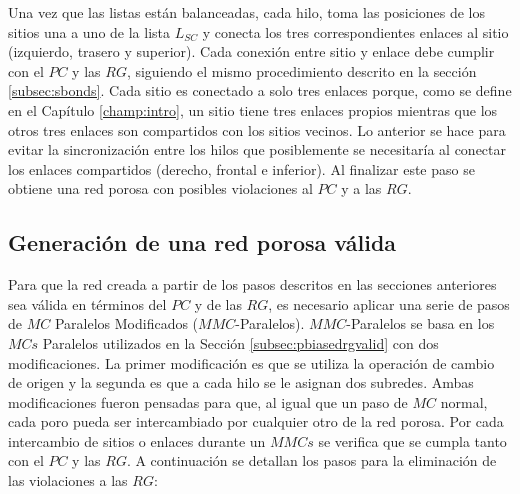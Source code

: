 Una vez que las listas están balanceadas, cada hilo, toma las posiciones de los sitios una a uno de la lista $L_{SC}$ y conecta los 
tres correspondientes enlaces al sitio (izquierdo, trasero y superior). Cada conexión entre sitio y enlace debe cumplir con 
el $PC$ y las $RG$, siguiendo el mismo procedimiento descrito en la sección \ref{subsec:sbonds}. Cada sitio es conectado a 
solo tres enlaces porque, como se define en el Capítulo \ref{champ:intro}, un sitio tiene tres enlaces propios mientras que 
los otros tres enlaces son compartidos con los sitios vecinos. Lo anterior se hace para evitar la sincronización entre los 
hilos que posiblemente se necesitaría al conectar los enlaces compartidos (derecho, frontal e inferior). Al finalizar este 
paso se obtiene una red porosa con posibles violaciones al $PC$ y a las $RG$.

\subsection{Generación de una red porosa válida}
\label{subsec:pvalid}
Para que la red creada a partir de los pasos descritos en las secciones anteriores sea válida en términos del $PC$ y de  las $RG$, es necesario aplicar una serie de pasos de $MC$ Paralelos Modificados ($MMC$-Paralelos). $MMC$-Paralelos se basa en los $MCs$ Paralelos utilizados en la Sección \ref{subsec:pbiasedrgvalid} con dos modificaciones. La primer modificación es que se utiliza la operación de cambio de origen y la segunda es que a cada hilo  se le asignan dos subredes. Ambas modificaciones fueron pensadas para que, al igual que un paso de $MC$ normal, cada poro pueda  ser intercambiado por cualquier otro de la red porosa. Por cada intercambio de sitios o enlaces durante un $MMCs$ se verifica  que se cumpla tanto con el $PC$ y las $RG$. A continuación se detallan los pasos para la eliminación de las violaciones a las $RG$:

